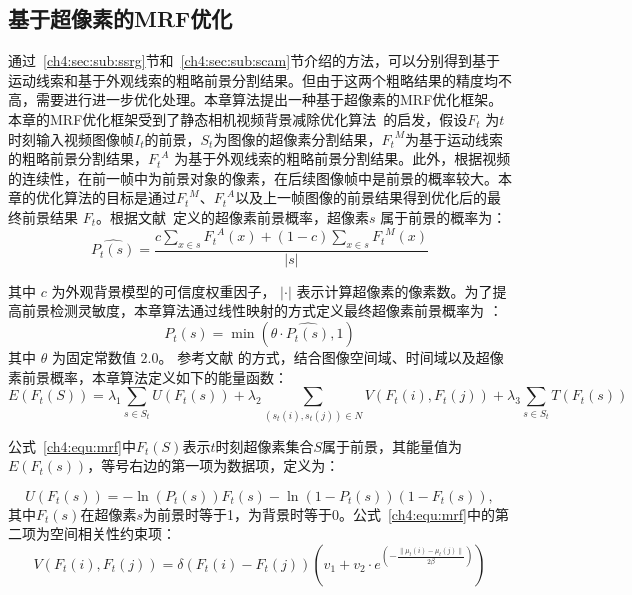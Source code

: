 \subsection{基于超像素的MRF优化}
\label {ch4:sec:MRF}

通过~\ref{ch4:sec:sub:ssrg}节和~\ref{ch4:sec:sub:scam}节介绍的方法，可以分别得到基于运动线索和基于外观线索的粗略前景分割结果。但由于这两个粗略结果的精度均不高，需要进行进一步优化处理。本章算法提出一种基于超像素的MRF优化框架。本章的MRF优化框架受到了静态相机视频背景减除优化算法~\cite{MRF}的启发，假设${F}_{t}$ 为$t$ 时刻输入视频图像帧${I}_{t}$的前景，$S_{t}$为图像的超像素分割结果，${{F}_{t}}^{M}$为基于运动线索的粗略前景分割结果，${F_{t}}^{A}$ 为基于外观线索的粗略前景分割结果。此外，根据视频的连续性，在前一帧中为前景对象的像素，在后续图像帧中是前景的概率较大。本章的优化算法的目标是通过${{F}_{t}}^{M}$、${{F}_{t}}^{A}$以及上一帧图像的前景结果得到优化后的最终前景结果 $F_{t}$。根据文献~定义的超像素前景概率，超像素$s$ 属于前景的概率为：
\begin{equation}
\label{ch4:equ:fgprop}
\hat{P_{t}(s)} = \frac{c\sum_{x \in s}{F_{t}}^{A}(x) + (1-c)\sum_{x \in s}{F_{t}}^{M}(x)}{\vert s \vert}
\end{equation}



 其中 $c$ 为外观背景模型的可信度权重因子， $\vert\cdot\vert$ 表示计算超像素的像素数。为了提高前景检测灵敏度，本章算法通过线性映射的方式定义最终超像素前景概率为 ：
$$P_{t}(s) = \min(\theta \cdot \hat{P_{t}(s)},1)$$
其中 $\theta$ 为固定常数值 $2.0$。 参考文献 的方式，结合图像空间域、时间域以及超像素前景概率，本章算法定义如下的能量函数：
\begin{equation}
\label{ch4:equ:mrf}
E(F_{t}(S)) = \lambda_{1}\sum_{s \in S_{t}}{U(F_{t}(s))} + \lambda_{2}\sum_{(s_{t}(i),s_{t}(j))\in N}{V(F_{t}(i),F_{t}(j))} + \lambda_{3}\sum_{s \in S_{t}}{T(F_{t}(s))}
\end{equation}



公式~\ref{ch4:equ:mrf}中$F_{t}(S)$表示$t$时刻超像素集合$S$属于前景，其能量值为$E(F_{t}(s))$，等号右边的第一项为数据项，定义为：

$$ U(F_{t}(s)) = -\ln(P_{t}(s))F_{t}(s) - \ln(1-P_{t}(s))(1-F_{t}(s)), $$
其中$F_{t}(s)$在超像素$s$为前景时等于1，为背景时等于0。公式~\ref{ch4:equ:mrf}中的第二项为空间相关性约束项：
\begin{equation}
\label{ch4:equ:mrfSpace}
V(F_{t}(i),F_{t}(j)) = \delta( F_{t}(i) - F_{t}(j)) (v_{1} + v_{2}\cdot e^{(-\frac{\parallel \mu_{t}(i) - \mu_{t}(j)\parallel}{2\beta})})
\end{equation}

